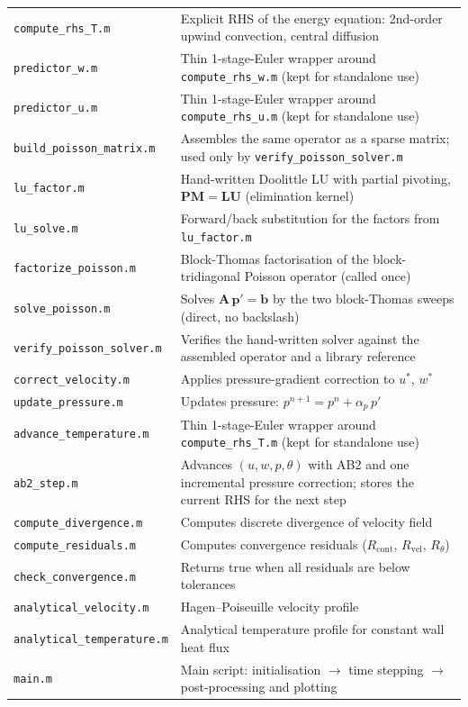 \documentclass[12pt,a4paper]{article}
\begin{document}
\begin{table}[H]
\begin{tabular}{lp{8.5cm}}
\texttt{compute\_rhs\_T.m}    & Explicit RHS of the energy equation: 2nd-order upwind convection, central diffusion \\
\texttt{predictor\_w.m}       & Thin 1-stage-Euler wrapper around \texttt{compute\_rhs\_w.m} (kept for standalone use) \\
\texttt{predictor\_u.m}       & Thin 1-stage-Euler wrapper around \texttt{compute\_rhs\_u.m} (kept for standalone use) \\
\texttt{build\_poisson\_matrix.m} & Assembles the same operator as a sparse matrix; used only by \texttt{verify\_poisson\_solver.m} \\
\texttt{lu\_factor.m}         & Hand-written Doolittle LU with partial pivoting, $\mathbf{P}\mathbf{M} = \mathbf{L}\mathbf{U}$ (elimination kernel) \\
\texttt{lu\_solve.m}          & Forward/back substitution for the factors from \texttt{lu\_factor.m} \\
\texttt{factorize\_poisson.m} & Block-Thomas factorisation of the block-tridiagonal Poisson operator (called once) \\
\texttt{solve\_poisson.m}     & Solves $\mathbf{A}\,\mathbf{p}' = \mathbf{b}$ by the two block-Thomas sweeps (direct, no backslash) \\
\texttt{verify\_poisson\_solver.m} & Verifies the hand-written solver against the assembled operator and a library reference \\
\texttt{correct\_velocity.m}  & Applies pressure-gradient correction to $u^*$, $w^*$ \\
\texttt{update\_pressure.m}   & Updates pressure: $p^{n+1} = p^n + \alpha_p\,p'$ \\
\texttt{advance\_temperature.m} & Thin 1-stage-Euler wrapper around \texttt{compute\_rhs\_T.m} (kept for standalone use) \\
\texttt{ab2\_step.m}          & Advances $(u,w,p,\theta)$ with AB2 and one incremental pressure correction; stores the current RHS for the next step \\
\texttt{compute\_divergence.m}   & Computes discrete divergence of velocity field \\
\texttt{compute\_residuals.m}    & Computes convergence residuals ($R_{\text{cont}}$, $R_{\text{vel}}$, $R_{\theta}$) \\
\texttt{check\_convergence.m}    & Returns true when all residuals are below tolerances \\
\texttt{analytical\_velocity.m}  & Hagen--Poiseuille velocity profile \\
\texttt{analytical\_temperature.m} & Analytical temperature profile for constant wall heat flux \\
\texttt{main.m}               & Main script: initialisation $\to$ time stepping $\to$ post-processing and plotting \\
\bottomrule
\end{tabular}
\end{table}
\end{document}
